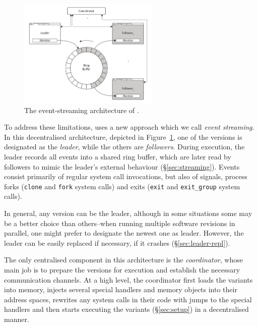 \begin{figure}[t]
  \begin{center}
    \includegraphics[width=0.6\textwidth]{efficient-execution/figures/architecture}
    \caption{The event-streaming architecture of \varan.}
    \label{fig:architecture}
  \end{center}
\end{figure}

To address these limitations, \varan uses a new approach which we call
\emph{event streaming}.  In this decentralised architecture,
depicted in Figure~\ref{fig:architecture}, one of the
versions is designated as the \textit{leader}, while the others are
\textit{followers}. During execution, the leader records all events into a
shared ring buffer, which are later read by followers to mimic the leader's
external behaviour (\S\ref{sec:streaming}). Events consist primarily
of regular system
call invocations, but also of signals, process forks (\ie \lstinline`clone`
and \lstinline`fork` system calls) and exits (\ie \lstinline`exit` and
\lstinline`exit_group` system calls).

In general, any version can be the leader, although in some situations
some may be a better choice than others--\eg when running multiple
software revisions in parallel, one might prefer to designate the
newest one as leader.  However, the leader can be easily replaced if
necessary, \eg if it crashes (\S\ref{sec:leader-repl}).

The only centralised component in this architecture is the
\textit{coordinator}, whose main job is to prepare the versions for
execution and establish the necessary communication channels.  At a
high level, the coordinator first loads the variants into memory,
injects several special handlers and memory objects into their address
spaces, rewrites any system calls in their code with jumps to the
special handlers and then starts executing the variants
(\S\ref{sec:setup}) in a decentralised manner.

